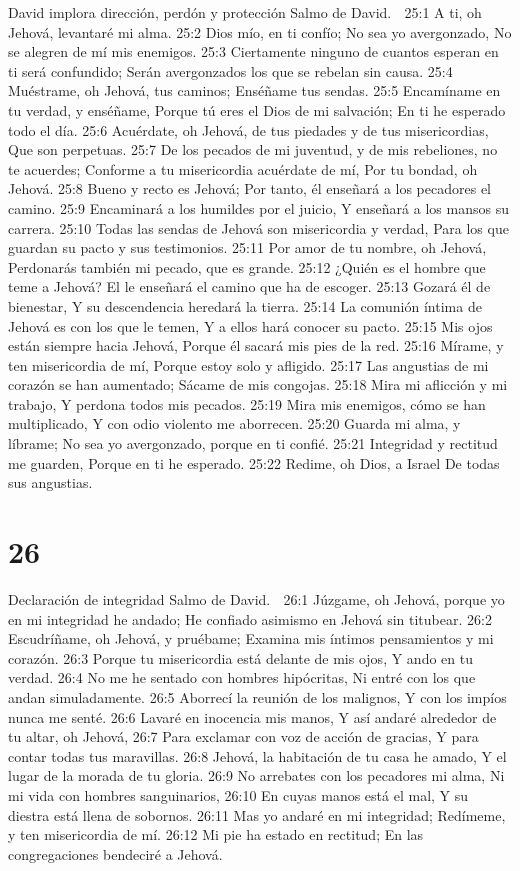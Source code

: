 David implora dirección, perdón y protección 
Salmo de David. 

25:1 A ti, oh Jehová, levantaré mi alma. 
25:2 Dios mío, en ti confío; 
No sea yo avergonzado, 
No se alegren de mí mis enemigos. 
25:3 Ciertamente ninguno de cuantos esperan en ti será confundido; 
Serán avergonzados los que se rebelan sin causa. 
25:4 Muéstrame, oh Jehová, tus caminos; 
Enséñame tus sendas. 
25:5 Encamíname en tu verdad, y enséñame, 
Porque tú eres el Dios de mi salvación; 
En ti he esperado todo el día. 
25:6 Acuérdate, oh Jehová, de tus piedades y de tus misericordias, 
Que son perpetuas. 
25:7 De los pecados de mi juventud, y de mis rebeliones, no te acuerdes; 
Conforme a tu misericordia acuérdate de mí, 
Por tu bondad, oh Jehová. 
25:8 Bueno y recto es Jehová; 
Por tanto, él enseñará a los pecadores el camino. 
25:9 Encaminará a los humildes por el juicio, 
Y enseñará a los mansos su carrera. 
25:10 Todas las sendas de Jehová son misericordia y verdad, 
Para los que guardan su pacto y sus testimonios. 
25:11 Por amor de tu nombre, oh Jehová, 
Perdonarás también mi pecado, que es grande. 
25:12 ¿Quién es el hombre que teme a Jehová? 
El le enseñará el camino que ha de escoger. 
25:13 Gozará él de bienestar, 
Y su descendencia heredará la tierra. 
25:14 La comunión íntima de Jehová es con los que le temen, 
Y a ellos hará conocer su pacto. 
25:15 Mis ojos están siempre hacia Jehová, 
Porque él sacará mis pies de la red. 
25:16 Mírame, y ten misericordia de mí, 
Porque estoy solo y afligido. 
25:17 Las angustias de mi corazón se han aumentado; 
Sácame de mis congojas. 
25:18 Mira mi aflicción y mi trabajo, 
Y perdona todos mis pecados. 
25:19 Mira mis enemigos, cómo se han multiplicado, 
Y con odio violento me aborrecen. 
25:20 Guarda mi alma, y líbrame; 
No sea yo avergonzado, porque en ti confié. 
25:21 Integridad y rectitud me guarden, 
Porque en ti he esperado. 
25:22 Redime, oh Dios, a Israel 
De todas sus angustias. 

\chapter{26}

Declaración de integridad 
Salmo de David. 

26:1 Júzgame, oh Jehová, porque yo en mi integridad he andado; 
He confiado asimismo en Jehová sin titubear. 
26:2 Escudríñame, oh Jehová, y pruébame; 
Examina mis íntimos pensamientos y mi corazón. 
26:3 Porque tu misericordia está delante de mis ojos, 
Y ando en tu verdad. 
26:4 No me he sentado con hombres hipócritas, 
Ni entré con los que andan simuladamente. 
26:5 Aborrecí la reunión de los malignos, 
Y con los impíos nunca me senté. 
26:6 Lavaré en inocencia mis manos, 
Y así andaré alrededor de tu altar, oh Jehová, 
26:7 Para exclamar con voz de acción de gracias, 
Y para contar todas tus maravillas. 
26:8 Jehová, la habitación de tu casa he amado, 
Y el lugar de la morada de tu gloria. 
26:9 No arrebates con los pecadores mi alma, 
Ni mi vida con hombres sanguinarios, 
26:10 En cuyas manos está el mal, 
Y su diestra está llena de sobornos. 
26:11 Mas yo andaré en mi integridad; 
Redímeme, y ten misericordia de mí. 
26:12 Mi pie ha estado en rectitud; 
En las congregaciones bendeciré a Jehová. 

